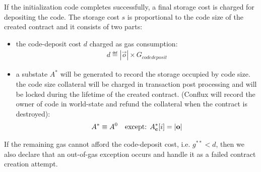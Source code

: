 If the initialization code completes successfully,
a final storage cost is charged for depositing the code.
The storage cost $s$ is proportional to the code size of the created contract and it consists of two parts:
\begin{itemize}
	\item the code-deposit cost $d$ charged as gas consumption:
	\begin{align}
		d \eqdef   |\vec{o}| \times G_{codedeposit}
	\end{align}

	\item a substate $A^{*}$ will be generated to record the storage occupied by code size. the code size collateral will be charged in transaction post processing and will be locked during the lifetime of the created contract. (Conflux will record the owner of code in world-state and refund the collateral when the contract is destroyed):
	\begin{align}
		A^{*} \equiv   A^0 \quad\mbox{except: }A^*_{\bf c}[i]=|\mathbf{o}|
	\end{align}
\end{itemize}



If the remaining gas cannot afford the code-deposit cost, i.e. $g^{**}<d$, then we also declare that an out-of-gas exception occurs and handle it as a failed contract creation attempt.


